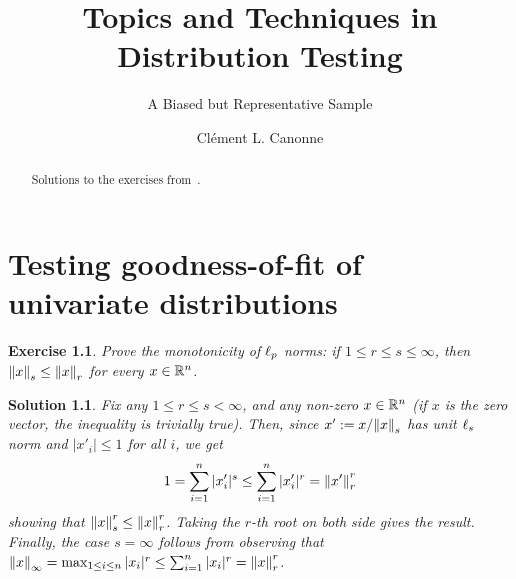 \documentclass[biber]{nowfnt} %
\title{Topics and Techniques in Distribution Testing}
\subtitle{A Biased but Representative Sample}
\author[1]{Cl\'ement L. Canonne}
\affil[1]{University of Sydney; clement.canonne@sydney.edu.au}
\newtheorem{question}{Exercise}[chapter]
\newtheorem{solution}{Solution}[chapter]
\begin{document}
\makeabstracttitle
\begin{abstract}
Solutions to the exercises from~\citet{CIT-114}.
\end{abstract}

\setcounter{chapter}{1}
\chapter{Testing goodness-of-fit of univariate distributions}
  \label{chap:identity}
  
  
 \begin{question}\label{ex:identity:monotonicity:lp}
  Prove the monotonicity of $\lp[p]$ norms: if $1\leq r\leq s \leq \infty$, then $\norm{x}_s \leq \norm{x}_r$ for every $x\in \R^n$.
\end{question}
\begin{solution}
Fix any $1\leq r\leq s < \infty$, and any non-zero $x\in\R^n$ (if $x$ is the zero vector, the inequality is trivially true). Then, since $x' \eqdef x/\norm{x}_s$ has unit $\lp[s]$ norm and $|x'_i| \leq 1$ for all $i$, we get
\[
	1 = \sum_{i=1}^n |x'_i|^s \leq \sum_{i=1}^n |x'_i|^r = \norm{x'}_r^r
\]
showing that $\norm{x}_s^r \leq \norm{x}_r^r$. Taking the $r$-th root on both side gives the result. Finally, the case $s=\infty$ follows from observing that $\norminf{x} = \max_{1\leq i\leq n} |x_i|^r \leq \sum_{i=1}^n |x_i|^r = \norm{x}_r^r$. 
\end{solution}
\end{document}
